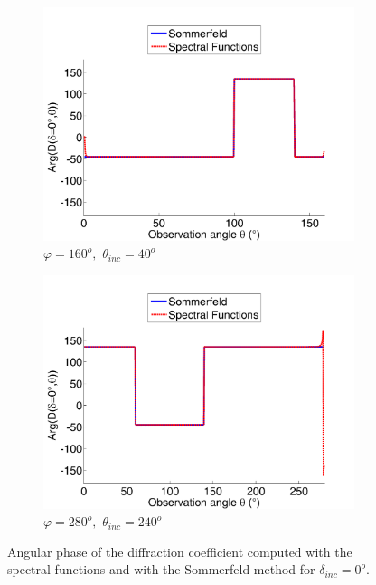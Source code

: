 \begin{figure}
\centering
\begin{subfigure}[b]{0.49\textwidth}
        \includegraphics[width=\textwidth]{images/chapter4/ArgD_160_40_0.png}
        \caption{$\varphi=160^o,  \, \, \theta_{inc}=40^o$}
        \label{C4:argac16040}
    \end{subfigure}
\begin{subfigure}[b]{0.49\textwidth}
        \includegraphics[width=\textwidth]{images/chapter4/ArgD_280_239_0.png}
        \caption{$\varphi=280^o, \, \, \theta_{inc}=240^o$}
        \label{C4:argac280240}
    \end{subfigure}
\caption{Angular phase of the diffraction coefficient computed with the spectral functions and with the Sommerfeld method for $\delta_{inc}=0^o$.}
\label{C4:Argcompac}
\end{figure}

